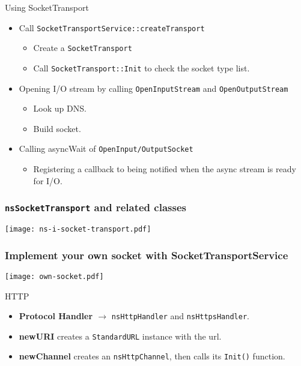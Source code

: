 \documentclass{beamer}
\begin{document}
\begin{frame}{Using SocketTransport}
  \begin{itemize}
  \item Call \texttt{SocketTransportService::createTransport}
    \begin{itemize}
    \item Create a \texttt{SocketTransport}
    \item Call \texttt{SocketTransport::Init} to check the socket type list.
    \end{itemize}
  \item Opening I/O stream by calling \texttt{OpenInputStream} and
    \texttt{OpenOutputStream}
    \begin{itemize}
    \item Look up DNS.
    \item Build socket.
    \end{itemize}
  \item Calling asyncWait of \texttt{OpenInput/OutputSocket}
    \begin{itemize}
    \item Registering a callback to being notified when the async stream is ready for I/O.
    \end{itemize}
  \end{itemize}
\end{frame}

\begin{frame}[fragile]
  \frametitle{\texttt{nsSocketTransport} and related classes}
  \begin{center}
    \texttt{[image: ns-i-socket-transport.pdf]}
  \end{center}
\end{frame}

\begin{frame}[fragile]
  \frametitle{Implement your own socket with SocketTransportService}
  \begin{center}
    \texttt{[image: own-socket.pdf]}
  \end{center}
\end{frame}


\begin{frame}{HTTP}
  \begin{itemize}
  \item \textbf{Protocol Handler $\rightarrow$} \texttt{nsHttpHandler} and \texttt{nsHttpsHandler}.
  \item \textbf{newURI} creates a \texttt{StandardURL} instance with the url.
  \item \textbf{newChannel} creates an \texttt{nsHttpChannel}, then calls its \texttt{Init()} function.
  \end{itemize}
\end{frame}
\end{document}
